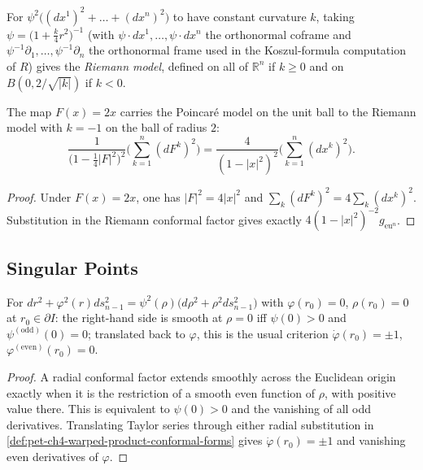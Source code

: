 \begin{remark}
  \label{rem:pet-ch4-riemann-model}

  For $\psi^2\big((dx^1)^2+\dots+(dx^n)^2\big)$ to have constant curvature $k$,
  taking $\psi=\big(1+\tfrac k4r^2\big)^{-1}$ (with $\psi\cdot dx^1,\dots,\psi\cdot dx^n$
  the orthonormal coframe and $\psi^{-1}\partial_1,\dots,\psi^{-1}\partial_n$ the
  orthonormal frame used in the Koszul-formula computation of $R$) gives the
  \emph{Riemann model}, defined on all of $\mathbb{R}^n$ if $k\ge0$ and on
  $B(0,2/\sqrt{|k|})$ if $k<0$.
\end{remark}

\begin{proposition}[the Riemann model with $k=-1$ is isometric to the Poincaré model]
  \label{prop:pet-ch4-riemann-poincare-isometric}

  The map $F(x)=2x$ carries the Poincaré model on the unit ball to the Riemann
  model with $k=-1$ on the ball of radius $2$:
  \[
    \frac1{\big(1-\tfrac14|F|^2\big)^2}\Big(\sum_{k=1}^n(dF^k)^2\Big)
    =\frac4{(1-|x|^2)^2}\Big(\sum_{k=1}^n(dx^k)^2\Big).
  \]
\end{proposition}
\begin{proof}
  \sketch
  Under $F(x)=2x$, one has $|F|^2=4|x|^2$ and
  $\sum_k(dF^k)^2=4\sum_k(dx^k)^2$. Substitution in the Riemann conformal factor
  gives exactly $4(1-|x|^2)^{-2}g_{\mathrm{eu}^n}$.
\end{proof}

\subsection{Singular Points}

\begin{proposition}
  \label{prop:pet-ch4-conformal-smoothness-criterion}

  For $dr^2+\varphi^2(r)ds_{n-1}^2=\psi^2(\rho)\big(d\rho^2+\rho^2ds_{n-1}^2\big)$
  with $\varphi(r_0)=0$, $\rho(r_0)=0$ at $r_0\in\partial I$: the right-hand side
  is smooth at $\rho=0$ iff $\psi(0)>0$ and $\psi^{(\mathrm{odd})}(0)=0$; translated
  back to $\varphi$, this is the usual criterion $\dot\varphi(r_0)=\pm1$,
  $\varphi^{(\mathrm{even})}(r_0)=0$.
\end{proposition}
\begin{proof}
  \sketch
  A radial conformal factor extends smoothly across the Euclidean origin exactly
  when it is the restriction of a smooth even function of $\rho$, with positive
  value there. This is equivalent to $\psi(0)>0$ and the vanishing of all odd
  derivatives. Translating Taylor series through either radial substitution in
  \cref{def:pet-ch4-warped-product-conformal-forms} gives
  $\dot\varphi(r_0)=\pm1$ and vanishing even derivatives of $\varphi$.
\end{proof}

